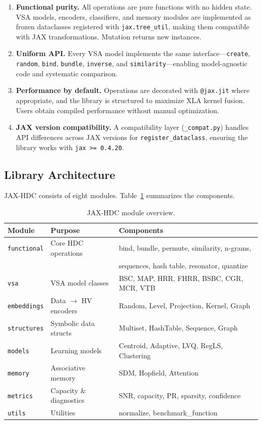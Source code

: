 \documentclass[twoside,11pt]{article}
\begin{document}
\begin{enumerate}
\item \textbf{Functional purity.} All operations are pure functions with no hidden state. VSA models, encoders, classifiers, and memory modules are implemented as frozen dataclasses registered with \texttt{jax.tree\_util}, making them compatible with JAX transformations. Mutation returns new instances.

\item \textbf{Uniform API.} Every VSA model implements the same interface---\texttt{create}, \texttt{random}, \texttt{bind}, \texttt{bundle}, \texttt{inverse}, and \texttt{similarity}---enabling model-agnostic code and systematic comparison.

\item \textbf{Performance by default.} Operations are decorated with \texttt{@jax.jit} where appropriate, and the library is structured to maximize XLA kernel fusion. Users obtain compiled performance without manual optimization.

\item \textbf{JAX version compatibility.} A compatibility layer (\texttt{\_compat.py}) handles API differences across JAX versions for \texttt{register\_dataclass}, ensuring the library works with \texttt{jax >= 0.4.20}.
\end{enumerate}

\subsection{Library Architecture}

JAX-HDC consists of eight modules. Table~\ref{tab:modules} summarizes the components.

\begin{table}[t]
\centering
\caption{JAX-HDC module overview.}
\label{tab:modules}
\begin{tabular}{lll}
\toprule
\textbf{Module} & \textbf{Purpose} & \textbf{Components} \\
\midrule
\texttt{functional} & Core HDC operations & bind, bundle, permute, similarity, n-grams, \\
 & & sequences, hash table, resonator, quantize \\
\texttt{vsa} & VSA model classes & BSC, MAP, HRR, FHRR, BSBC, CGR, MCR, VTB \\
\texttt{embeddings} & Data $\to$ HV encoders & Random, Level, Projection, Kernel, Graph \\
\texttt{structures} & Symbolic data structs & Multiset, HashTable, Sequence, Graph \\
\texttt{models} & Learning models & Centroid, Adaptive, LVQ, RegLS, Clustering \\
\texttt{memory} & Associative memory & SDM, Hopfield, Attention \\
\texttt{metrics} & Capacity \& diagnostics & SNR, capacity, PR, sparsity, confidence \\
\texttt{utils} & Utilities & normalize, benchmark\_function \\
\bottomrule
\end{tabular}
\end{table}
\end{document}
